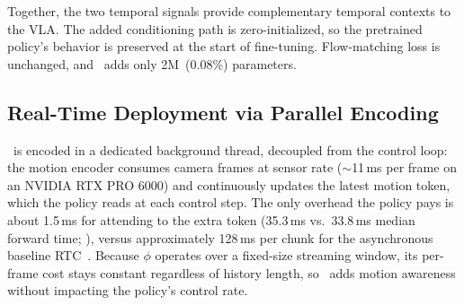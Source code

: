 Together, the two temporal signals provide complementary temporal contexts to the VLA.
The added conditioning path is zero-initialized, so the pretrained policy's behavior is preserved at the start of fine-tuning. Flow-matching loss is unchanged, and \ours\ adds only 2M~($0.08$\%) parameters.

\vspace{-0.3em}
\subsection{Real-Time Deployment via Parallel Encoding}

\TEMPOMOT\ is encoded in a dedicated background thread, decoupled from the control loop: the motion encoder consumes camera frames at sensor rate ($\sim$11\,ms per frame on an NVIDIA RTX PRO 6000) and continuously updates the latest motion token, which the policy reads at each control step. The only overhead the policy pays is about 1.5\,ms for attending to the extra token (35.3\,ms vs.\ 33.8\,ms median forward time; ), versus approximately 128\,ms per chunk for the asynchronous baseline RTC~\cite{rtc}. Because $\phi$ operates over a fixed-size streaming window, its per-frame cost stays constant regardless of history length, so \ours\ adds motion awareness without impacting the policy's control rate.

